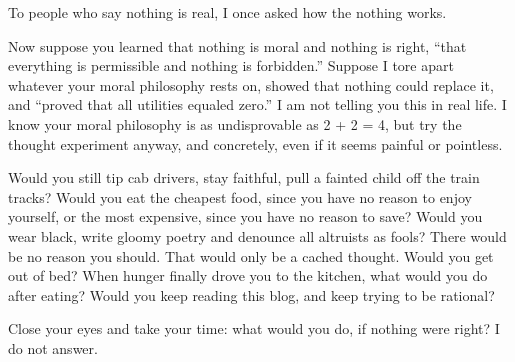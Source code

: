 
To people who say nothing is real, I once asked how the nothing works.

Now suppose you learned that nothing is moral and nothing is right, ``that everything is permissible and nothing is forbidden.''  Suppose I tore apart whatever your moral philosophy rests on, showed that nothing could replace it, and ``proved that all utilities equaled zero.'' I am not telling you this in real life. I know your moral philosophy is as undisprovable as 2 + 2 = 4, but try the thought experiment anyway, and concretely, even if it seems painful or pointless. 

Would you still tip cab drivers, stay faithful, pull a fainted child off the train tracks? Would you eat the cheapest food, since you have no reason to enjoy yourself, or the most expensive, since you have no reason to save? Would you wear black, write gloomy poetry and denounce all altruists as fools? There would be no reason you should. That would only be a cached thought. Would you get out of bed? When hunger finally drove you to the kitchen, what would you do after eating? Would you keep reading this blog, and keep trying to be rational?

Close your eyes and take your time: what would you do, if nothing were right? I do not answer. 
